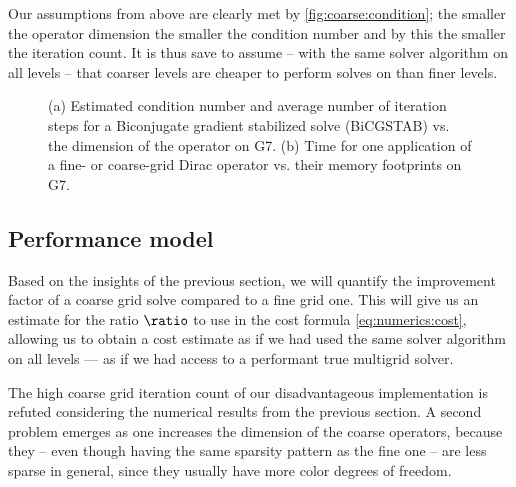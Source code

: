Our assumptions from above are clearly met by \cref{fig:coarse:condition}; the smaller the operator dimension the smaller the condition number and by this the smaller the iteration count.
It is thus save to assume -- with the same solver algorithm on all levels -- that coarser levels are cheaper to perform solves on than finer levels.


\begin{figure}
\centering

\hfill
{}

\caption{
(a) Estimated condition number and average number of iteration steps for a Biconjugate gradient stabilized solve (BiCGSTAB) vs. the dimension of the operator on G7. \takenfull
(b) Time for one application of a fine- or coarse-grid Dirac operator vs. their memory footprints on G7.
}
\label{fig:coarse}
\end{figure}

\subsection{Performance model}
\label{sec:numerics:performance:model}

Based on the insights of the previous section, we will quantify the improvement factor of a coarse grid solve compared to a fine grid one.
This will give us an estimate for the ratio $\ratio$ to use in the cost formula \cref{eq:numerics:cost}, allowing us to obtain a cost estimate as if we had used the same solver algorithm on all levels — \ie as if we had access to a performant true multigrid solver.



The high coarse grid iteration count of our disadvantageous implementation is refuted considering the numerical results from the previous section.
A second problem emerges as one increases the dimension of the coarse operators, because they -- even though having the same sparsity pattern as the fine one -- are less sparse in general, since they usually have more color degrees of freedom.

